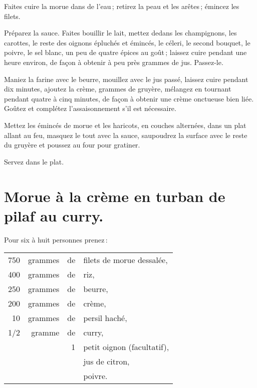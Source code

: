 Faites cuire la morue dans de l'eau ; retirez la peau et les arêtes ; émincez
les filets.

Préparez la sauce. Faites bouillir le lait, mettez dedans les champignons, les
carottes, le reste des oignons épluchés et émincés, le céleri, le second
bouquet, le poivre, le sel blanc, un peu de quatre épices au goût ; laissez
cuire pendant une heure environ, de façon à obtenir à peu près {\mmm} grammes de
jus. Passez-le.

Maniez la farine avec le beurre, mouillez avec le jus passé, laissez cuire
pendant dix minutes, ajoutez la crème, {\mmm} grammes de gruyère, mélangez en
tournant pendant quatre à cinq minutes, de façon à obtenir une crème onctueuse
bien liée. Goûtez et complétez l'assaisonnement s'il est nécessaire.

Mettez les émincés de morue et les haricots, en couches alternées, dans un plat
allant au feu, masquez le tout avec la sauce, saupoudrez la surface avec le
reste du gruyère et poussez au four pour gratiner.

Servez dans le plat.

\section*{\centering Morue à la crème en turban de pilaf au curry.}

Pour six à huit personnes prenez :

\medskip

\footnotesize
\begin{longtable}{rrrp{16em}}
    750 & grammes & de & filets de morue dessalée,                                                        \\
    400 & grammes & de & riz,                                                                             \\
    250 & grammes & de & beurre,                                                                          \\
    200 & grammes & de & crème,                                                                           \\
     10 & grammes & de & persil haché,                                                                    \\
    1/2 & gramme  & de & curry,                                                                           \\
        &         &  1 & petit oignon (facultatif),                                                       \\
        &         &    & jus de citron,                                                                   \\
        &         &    & poivre.                                                                          \\
\end{longtable}
\normalsize

